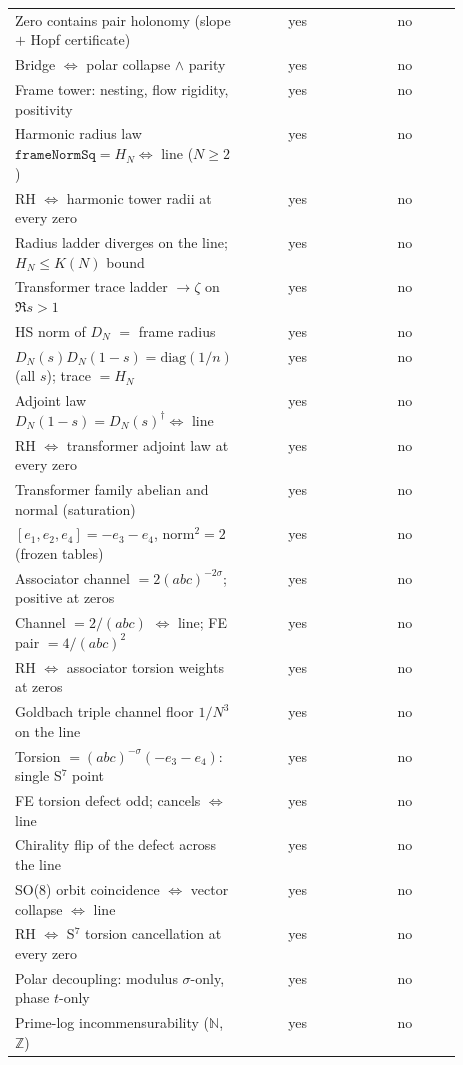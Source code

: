 \documentclass[11pt]{amsart}
\begin{document}
\begin{table}[h]
\begin{tabular}{@{}p{0.52\linewidth}cc@{}}
Zero contains pair holonomy (slope $+$ Hopf certificate) & yes & no \\
Bridge $\Leftrightarrow$ polar collapse $\wedge$ parity & yes & no \\
Frame tower: nesting, flow rigidity, positivity & yes & no \\
Harmonic radius law $\texttt{frameNormSq}=H_N\Leftrightarrow$ line ($N\ge2$) & yes & no \\
RH $\Leftrightarrow$ harmonic tower radii at every zero & yes & no \\
Radius ladder diverges on the line; $H_N\le K(N)$ bound & yes & no \\
Transformer trace ladder $\to\zeta$ on $\Re s>1$ & yes & no \\
HS norm of $D_N$ $=$ frame radius & yes & no \\
$D_N(s)D_N(1-s)=\mathrm{diag}(1/n)$ (all $s$); trace $=H_N$ & yes & no \\
Adjoint law $D_N(1-s)=D_N(s)^{\dagger}\Leftrightarrow$ line & yes & no \\
RH $\Leftrightarrow$ transformer adjoint law at every zero & yes & no \\
Transformer family abelian and normal (saturation) & yes & no \\
$[e_1,e_2,e_4]=-e_3-e_4$, norm$^2=2$ (frozen tables) & yes & no \\
Associator channel $=2(abc)^{-2\sigma}$; positive at zeros & yes & no \\
Channel $=2/(abc)$ $\Leftrightarrow$ line; FE pair $=4/(abc)^2$ & yes & no \\
RH $\Leftrightarrow$ associator torsion weights at zeros & yes & no \\
Goldbach triple channel floor $1/N^3$ on the line & yes & no \\
Torsion $=(abc)^{-\sigma}(-e_3-e_4)$: single S$^7$ point & yes & no \\
FE torsion defect odd; cancels $\Leftrightarrow$ line & yes & no \\
Chirality flip of the defect across the line & yes & no \\
SO(8) orbit coincidence $\Leftrightarrow$ vector collapse $\Leftrightarrow$ line & yes & no \\
RH $\Leftrightarrow$ S$^7$ torsion cancellation at every zero & yes & no \\
Polar decoupling: modulus $\sigma$-only, phase $t$-only & yes & no \\
Prime-log incommensurability ($\mathbb{N}$, $\mathbb{Z}$) & yes & no \\

\end{tabular}
\end{table}
\end{document}
